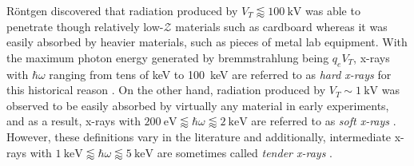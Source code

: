 R\"ontgen discovered that radiation produced by $V_T \lessapprox \SI{100}{\kilo\volt}$ was able to penetrate though relatively low-$\mathcal{Z}$ materials such as cardboard whereas it was easily absorbed by heavier materials, such as pieces of metal lab equipment. %
With the maximum photon energy generated by bremmstrahlung being $q_e V_T$, x-rays with $\hbar \omega$ ranging from tens of \si{\kilo\electronvolt} to \SI{100}{\kilo\electronvolt} are referred to as \emph{hard x-rays} for this historical reason \cite{Als-Nielsen11}. 
On the other hand, radiation produced by $V_T \sim \SI{1}{\kilo\volt}$ was observed to be easily absorbed by virtually any material in early experiments, and as a result, x-rays with $ \SI{200}{\electronvolt}\lessapprox \hbar \omega \lessapprox \SI{2}{\kilo\electronvolt}$ are referred to as \emph{soft x-rays} \cite{Attwood17}. %
However, these definitions vary in the literature and additionally, intermediate x-rays with $\SI{1}{\kilo\electronvolt} \lessapprox \hbar \omega \lessapprox \SI{5}{\kilo\electronvolt}$ are sometimes called \emph{tender x-rays} \cite{Northrup16,Senf16}.


